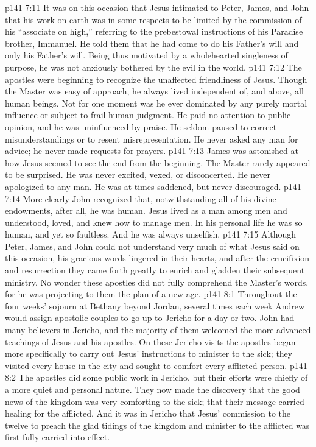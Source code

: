 \vs p141 7:11 It was on this occasion that Jesus intimated to Peter, James, and John that his work on earth was in some respects to be limited by the commission of his “associate on high,” referring to the prebestowal instructions of his Paradise brother, Immanuel. He told them that he had come to do his Father’s will and only his Father’s will. Being thus motivated by a wholehearted singleness of purpose, he was not anxiously bothered by the evil in the world.
\vs p141 7:12 The apostles were beginning to recognize the unaffected friendliness of Jesus. Though the Master was easy of approach, he always lived independent of, and above, all human beings. Not for one moment was he ever dominated by any purely mortal influence or subject to frail human judgment. He paid no attention to public opinion, and he was uninfluenced by praise. He seldom paused to correct misunderstandings or to resent misrepresentation. He never asked any man for advice; he never made requests for prayers.
\vs p141 7:13 James was astonished at how Jesus seemed to see the end from the beginning. The Master rarely appeared to be surprised. He was never excited, vexed, or disconcerted. He never apologized to any man. He was at times saddened, but never discouraged.\plusone
\vs p141 7:14 More clearly John recognized that, notwithstanding all of his divine endowments, after all, he was human. Jesus lived as a man among men and understood, loved, and knew how to manage men. In his personal life he was so human, and yet so faultless. And he was always unselfish.
\vs p141 7:15 Although Peter, James, and John could not understand very much of what Jesus said on this occasion, his gracious words lingered in their hearts, and after the crucifixion and resurrection they came forth greatly to enrich and gladden their subsequent ministry. No wonder these apostles did not fully comprehend the Master’s words, for he was projecting to them the plan of a new age.
\vs p141 8:1 Throughout the four weeks’ sojourn at Bethany beyond Jordan, several times each week Andrew would assign apostolic couples to go up to Jericho for a day or two. John had many believers in Jericho, and the majority of them welcomed the more advanced teachings of Jesus and his apostles. On these Jericho visits the apostles began more specifically to carry out Jesus’ instructions to minister to the sick; they visited every house in the city and sought to comfort every afflicted person.\plusone
\vs p141 8:2 The apostles did some public work in Jericho, but their efforts were chiefly of a more quiet and personal nature. They now made the discovery that the good news of the kingdom was very comforting to the sick; that their message carried healing for the afflicted. And it was in Jericho that Jesus’ commission to the twelve to preach the glad tidings of the kingdom and minister to the afflicted was first fully carried into effect.
